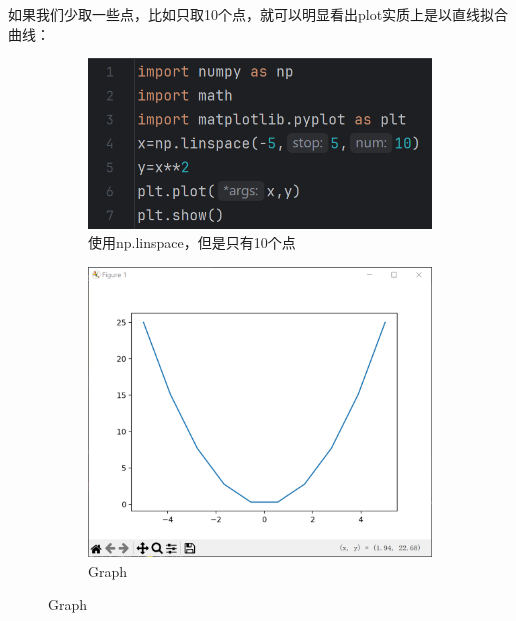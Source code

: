 \documentclass[12pt]{article}
\begin{document}
如果我们少取一些点，比如只取10个点，就可以明显看出plot实质上是以直线拟合曲线：

\begin{figure}[H]
    \centering
    \begin{subfigure}[b]{0.45\textwidth}
        \includegraphics[width=1.2\textwidth,height=0.6\textwidth]{线图1.png} %
        \caption{使用np.linspace，但是只有10个点}
        \label{fig:line-graph2}
    \end{subfigure}
    \hfill
    \begin{subfigure}[b]{0.45\textwidth}
        \includegraphics[width=\textwidth]{线图 pic1.png} %
        \caption{Graph}
        \label{fig:line-graph2-pic2}
    \end{subfigure}
\end{figure}
\end{document}

